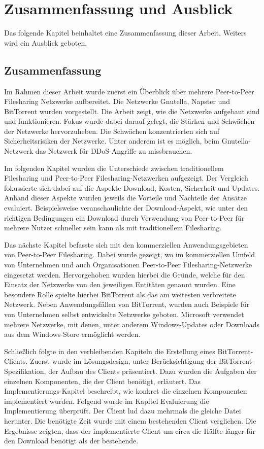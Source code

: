 \chapter{Zusammenfassung und Ausblick}
\label{cha:Zusammenfassung}
Das folgende Kapitel beinhaltet eine Zusammenfassung dieser Arbeit. Weiters wird ein Ausblick geboten. 

\section{Zusammenfassung}

Im Rahmen dieser Arbeit wurde zuerst ein Überblick über mehrere Peer-to-Peer File\-sharing Netzwerke aufbereitet. Die Netzwerke Gnutella, Napster und BitTorrent wurden vorgestellt. Die Arbeit zeigt, wie die Netzwerke aufgebaut sind und funktionieren. Fokus wurde dabei darauf gelegt, die Stärken und Schwächen der Netzwerke hervorzuheben. Die Schwächen konzentrierten sich auf Sicherheitsrisiken der Netzwerke. Unter anderem  ist es möglich, beim Gnutella-Netzwerk das Netzwerk für DDoS-Angriffe zu missbrauchen. 

Im folgenden Kapitel wurden die Unterschiede zwischen traditionellem Filesharing und Peer-to-Peer Filesharing-Netzwerken aufgezeigt. Der Vergleich fokussierte sich dabei auf die Aspekte Download, Kosten, Sicherheit und Updates. Anhand dieser Aspekte wurden jeweils die Vorteile und Nachteile der Ansätze evaluiert. Beispielsweise veranschaulichte der Download-Aspekt, wie unter den richtigen Bedingungen ein Download durch Verwendung von Peer-to-Peer für mehrere Nutzer schneller sein kann als mit traditionellem Filesharing. 

Das nächste Kapitel befasste sich mit den kommerziellen Anwendungsgebieten von Peer-to-Peer Filesharing. Dabei wurde gezeigt, wo im kommerziellen Umfeld von Unternehmen und auch Organisationen Peer-to-Peer Filesharing-Netzwerke eingesetzt werden. Hervorgehoben wurden hierbei die Gründe, welche für den Einsatz der Netzwerke von den jeweiligen Entitäten genannt wurden. Eine besondere Rolle spielte hierbei BitTorrent als das am weitesten verbreitete Netzwerk. Neben Anwendungsfällen von BitTorrent, wurden auch Beispiele für von Unternehmen selbst entwickelte Netzwerke geboten. Microsoft verwendet mehrere Netzwerke, mit denen, unter anderem Windows-Updates oder Downloads aus dem Windows-Store ermöglicht werden.   

Schließlich folgte in den verbleibenden Kapiteln die Erstellung eines BitTorrent-Clients. Zuerst wurde im Lösungsdesign, unter Berücksichtigung der BitTorrent-Spe\-zifikation, der Aufbau des Clients präsentiert. Dazu wurden die Aufgaben der einzelnen Komponenten, die der Client benötigt, erläutert. Das Implementierungs-Kapitel beschreibt, wie konkret die einzelnen Komponenten implementiert wurden. Folgend wurde im Kapitel Evaluierung die Implementierung überprüft. Der Client lud dazu mehrmals die gleiche Datei herunter. Die benötigte Zeit wurde mit einem bestehenden Client verglichen. Die Ergebnisse zeigten, dass der implementierte Client um circa die Hälfte länger für den Download benötigt als der bestehende. 

